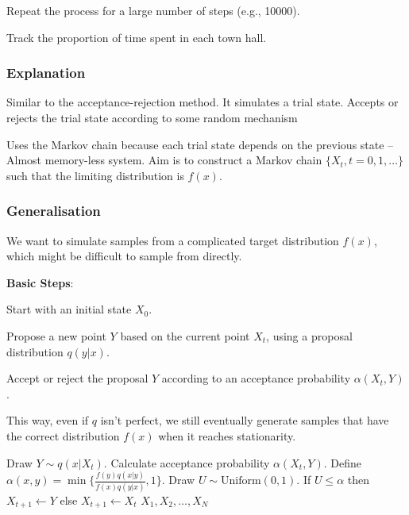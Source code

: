 \step Repeat the process for a large number of steps (e.g., 10000).

\step Track the proportion of time spent in each town hall.

\subsubsection{Explanation}

\indent 

Similar to the acceptance-rejection method. It simulates a trial state. Accepts or rejects the trial state according to some random mechanism

Uses the Markov chain because each trial state depends on the previous state – Almost memory-less system. Aim is to construct a Markov chain $\{X_t,t=0,1,\ldots\}$ such that the limiting distribution is $f(x)$.

\subsubsection{Generalisation}

\indent 

We want to simulate samples from a complicated target distribution $f(x)$, which might be difficult to sample from directly.

\noindent \textbf{Basic Steps}:

\step Start with an initial state $X_0$.

\step Propose a new point $Y$ based on the current point $X_t$, using a proposal distribution $q(y|x)$.

\step Accept or reject the proposal $Y$ according to an acceptance probability $\alpha(X_t,Y)$.

This way, even if $q$ isn’t perfect, we still eventually generate samples that have the correct distribution $f(x)$ when it reaches stationarity.

\begin{algorithm}[H]
\caption{Metropolis-Hastings algorithm}
\begin{algorithmic}
        \State Draw $Y\sim q(x|X_t)$.
        \State Calculate acceptance probability $\alpha(X_t,Y)$.
        \State Define $\alpha(x,y) = \min\{\frac{f(y)q(x|y)}{f(x)q(y|x)},1\}$.
        \State Draw $U\sim \text{Uniform} (0,1)$.
        \State If $U\leq \alpha$ then $X_{t+1} \leftarrow Y$ else $X_{t+1}\leftarrow X_t$
    \EndFor
    \Ensure $X_1,X_2,\ldots,X_N$
\end{algorithmic}
\end{algorithm}


